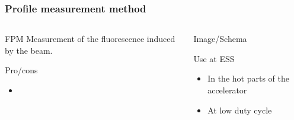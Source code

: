 \begin{frame}
  \frametitle{Profile measurement method}
  \begin{columns}
    \begin{column}{0.45\textwidth}
      \begin{block}{FPM}
        Measurement of the fluorescence induced by the beam.
      \end{block}
      \begin{block}{Pro/cons}
        \begin{itemize}
          \item
        \end{itemize}
      \end{block}
    \end{column}
    \begin{column}{0.45\textwidth}
      Image/Schema
      \begin{block}{Use at ESS}
        \begin{itemize}
          \item In the hot parts of the accelerator
          \item At low duty cycle
        \end{itemize}
      \end{block}
    \end{column}
  \end{columns}
\end{frame}

